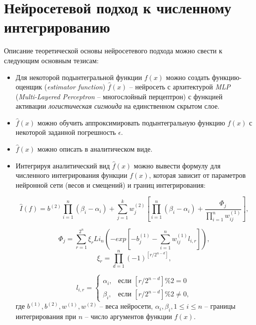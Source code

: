 \documentclass[a4paper,12pt]{article} %
\begin{document}
\section{Нейросетевой подход к численному интегрированию}

Описание теоретической основы нейросетевого подхода можно свести к следующим основным тезисам:

\begin{itemize}
    \item Для некоторой подынтегральной функции $ f(x) $ можно создать функцию-оценщик (\textit{estimator function}) $ \hat{f}(x) $ -- нейросеть с архитектурой \textit{MLP} (\textit{Multi-Layered Perceptron} -- многослойный перцептрон) с функцией активации \textit{логистическая сигмоида} на единственном скрытом слое.
    \item $ \hat{f}(x) $ можно обучить аппроксимировать подынтегральную функцию $ f(x) $ с некоторой заданной погрешность $ \epsilon $.
    \item $ \hat{f}(x) $ можно описать в аналитическом виде.
    \item Интегрируя аналитический вид $ \hat{f}(x) $ можно вывести формулу для численного интегрирования функции $ f(x) $, которая зависит от параметров нейронной сети (весов и смещений) и границ интегрирования:

\begin{equation}
    \hat{I}(f) = b^{(2)}\prod_{i=1}^{n}(\beta_i - \alpha_i) + \sum_{j=1}^{k}w_j^{(2)}[\prod_{i=1}^{n}(\beta_i - \alpha_i) + \frac{\Phi_j}{\prod_{i=1}^{n}w_{ij}^{(1)}}],
\end{equation}

\begin{equation}
    \Phi_j = \sum_{r=1}^{2^n}\xi_{r}Li_n(-exp[-b_j^{(1)} - \sum_{i=1}^{n}w_{ij}^{(1)}l_{i,r}]),
\end{equation}
\begin{equation}
    \xi_{r} = \prod_{d=1}^{n}(-1)^{[{r}/{2^{n-d}}]},
\end{equation}

\begin{equation}
    l_{i,r} = \left\{
\begin{array}{ll}
\alpha_i, & \text{если } [{r}/{2^{n-d}}] \% 2 = 0 \\
\beta_i, & \text{если } [{r}/{2^{n-d}}] \% 2 \neq 0,
\end{array}
\right.
\end{equation}
    где $b^{(1)}, b^{(2)}, w^{(1)}, w^{(2)}$ -- веса нейросети, $\alpha_i, \beta_i, 1 \leq i \leq n$ -- границы интегрирования при $n$ -- число аргументов функции $ f(x) $.
\end{itemize}
\end{document}
